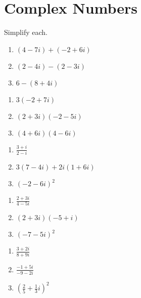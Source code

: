 \chapter{Complex Numbers}

Simplify each.

\begin{multicols}{3}
\begin{enumerate}
	\item $(4-7i)+(-2+6i)$
	\item $(2-4i)-(2-3i)$
	\item $6 - (8 + 4i)$
\end{enumerate}	\setcounter{Review}{\value{enumi}}
\end{multicols}

\begin{multicols}{3}
\begin{enumerate}		\setcounter{enumi}{\value{Review}}
	\item $3(-2 + 7i)$
	\item $(2+3i)(-2-5i)$
	\item $(4+6i)(4-6i)$
\end{enumerate}	\setcounter{Review}{\value{enumi}}
\end{multicols}

\begin{multicols}{3}
\begin{enumerate}		\setcounter{enumi}{\value{Review}}
	\item $\frac{3+i}{2-i}$
	\item $3(7-4i)+2i(1+6i)$
	\item $(-2-6i)^2$
\end{enumerate}	\setcounter{Review}{\value{enumi}}
\end{multicols}

\begin{multicols}{3}
\begin{enumerate}		\setcounter{enumi}{\value{Review}}
	\item $\frac{2+3i}{4-5i}$
	\item $(2+3i)(-5+i)$
	\item $(-7 - 5i)^2$
\end{enumerate}	\setcounter{Review}{\value{enumi}}
\end{multicols}

\begin{multicols}{3}
\begin{enumerate}		\setcounter{enumi}{\value{Review}}
	\item $\frac{3+2i}{8+9i}$
	\item $\frac{-1+5i}{-9-2i}$
	\item $\left(\frac{2}{5} + \frac{1}{3}i\right)^2$
\end{enumerate}	\setcounter{Review}{\value{enumi}}
\end{multicols}



